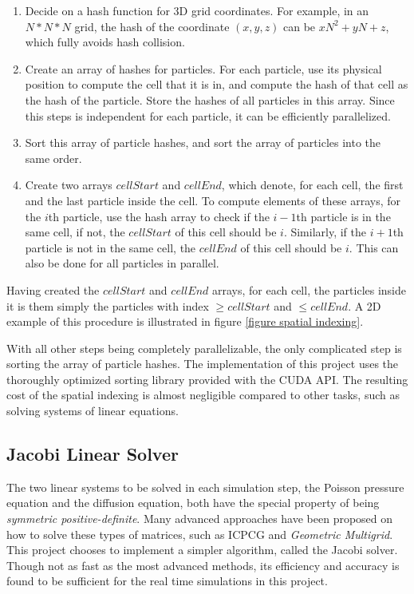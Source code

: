 \begin{enumerate}
    \item Decide on a hash function for 3D grid coordinates. For example, in an $N*N*N$ grid, the hash of the coordinate $(x,y,z)$ can be $xN^2+yN+z$, which fully avoids hash collision.
    
    \item Create an array of hashes for particles. For each particle, use its physical position to compute the cell that it is in, and compute the hash of that cell as the hash of the particle. Store the hashes of all particles in this array. Since this steps is independent for each particle, it can be efficiently parallelized.
    
    \item Sort this array of particle hashes, and sort the array of particles into the same order. 
    
    \item Create two arrays $cellStart$ and $cellEnd$, which denote, for each cell, the first and the last particle inside the cell. To compute elements of these arrays, for the $i$th particle, use the hash array to check if the $i-1$th particle is in the same cell, if not, the $cellStart$ of this cell should be $i$. Similarly, if the $i+1$th particle is not in the same cell, the $cellEnd$ of this cell should be $i$. This can also be done for all particles in parallel.
    
\end{enumerate}
Having created the $cellStart$ and $cellEnd$ arrays, for each cell, the particles inside it is them simply the particles with index $\geq cellStart$ and $\leq cellEnd$. A 2D example of this procedure is illustrated in figure \ref{figure spatial indexing}.

With all other steps being completely parallelizable, the only complicated step is sorting the array of particle hashes. The implementation of this project uses the thoroughly optimized sorting library provided with the CUDA API. The resulting cost of the spatial indexing is almost negligible compared to other tasks, such as solving systems of linear equations.



\subsection{Jacobi Linear Solver}
The two linear systems to be solved in each simulation step, the Poisson pressure equation and the diffusion equation, both have the special property of being \textit{symmetric positive-definite}. Many advanced approaches have been proposed on how to solve these types of matrices, such as ICPCG \cite{bridson2015fluid} and \textit{Geometric Multigrid}\cite{chentanez2011real}. This project chooses to implement a simpler algorithm, called the Jacobi solver. Though not as fast as the most advanced methods, its efficiency and accuracy is found to be sufficient for the real time simulations in this project.

